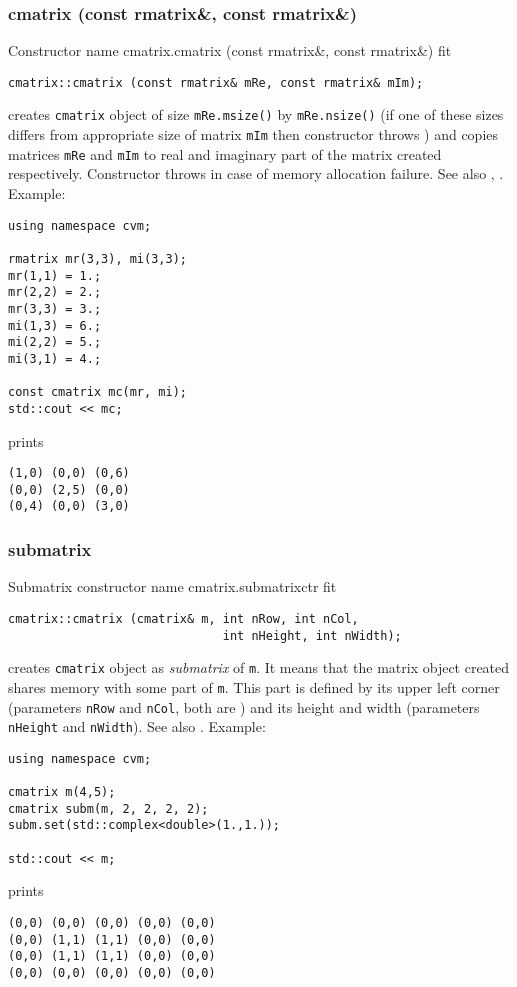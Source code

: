 \subsubsection{cmatrix (const rmatrix\&, const rmatrix\&)}
Constructor%
\pdfdest name {cmatrix.cmatrix (const rmatrix&, const rmatrix&)} fit
\begin{verbatim}
cmatrix::cmatrix (const rmatrix& mRe, const rmatrix& mIm);
\end{verbatim}
creates  \verb"cmatrix" object
of size \verb"mRe.msize()" by \verb"mRe.nsize()"
(if one of these sizes differs from appropriate size of matrix
\verb"mIm" then  constructor throws )
and copies matrices \verb"mRe" and \verb"mIm"
to  real and imaginary part of the matrix created respectively.
Constructor throws  
in case of memory allocation failure.
See also , .
Example:
\begin{Verbatim}
using namespace cvm;

rmatrix mr(3,3), mi(3,3);
mr(1,1) = 1.;
mr(2,2) = 2.;
mr(3,3) = 3.;
mi(1,3) = 6.;
mi(2,2) = 5.;
mi(3,1) = 4.;

const cmatrix mc(mr, mi);
std::cout << mc;
\end{Verbatim}
prints
\begin{Verbatim}
(1,0) (0,0) (0,6)
(0,0) (2,5) (0,0)
(0,4) (0,0) (3,0)
\end{Verbatim}
\newpage




\subsubsection{submatrix}
Submatrix constructor%
\pdfdest name {cmatrix.submatrixctr} fit
\begin{verbatim}
cmatrix::cmatrix (cmatrix& m, int nRow, int nCol, 
                              int nHeight, int nWidth);
\end{verbatim}
creates  \verb"cmatrix" object as  \emph{submatrix} of \verb"m".
It means that the matrix object created shares memory with some part
of \verb"m". This part is defined by its upper left corner (parameters 
\verb"nRow" and \verb"nCol", both are \Based)
and its height and width (parameters 
\verb"nHeight" and \verb"nWidth").
See also .
Example:
\begin{Verbatim}
using namespace cvm;

cmatrix m(4,5);
cmatrix subm(m, 2, 2, 2, 2);
subm.set(std::complex<double>(1.,1.));

std::cout << m;
\end{Verbatim}
prints
\begin{Verbatim}
(0,0) (0,0) (0,0) (0,0) (0,0)
(0,0) (1,1) (1,1) (0,0) (0,0)
(0,0) (1,1) (1,1) (0,0) (0,0)
(0,0) (0,0) (0,0) (0,0) (0,0)
\end{Verbatim}
\newpage



